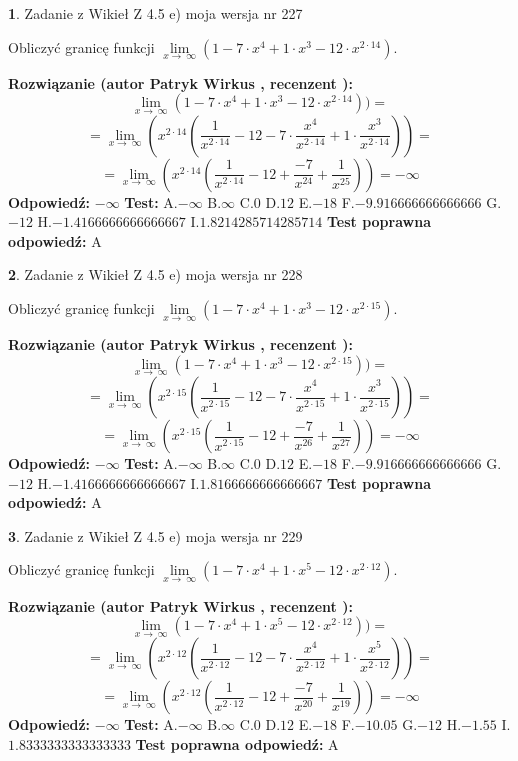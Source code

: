 \documentclass[12pt, a4paper]{article}
\theoremstyle{definition} %
\newtheorem{zad}{}
\newcommand{\zadStart}[1]{\begin{zad}#1\newline}
\newcommand{\zadStop}{\end{zad}}
\newcommand{\rozwStart}[2]{\noindent \textbf{Rozwiązanie (autor #1 , recenzent #2): }\newline}
\newcommand{\rozwStop}{\newline}
\newcommand{\odpStart}{\noindent \textbf{Odpowiedź:}\newline}
\newcommand{\odpStop}{\newline}
\newcommand{\testStart}{\noindent \textbf{Test:}\newline}
\newcommand{\testStop}{\newline}
\newcommand{\kluczStart}{\noindent \textbf{Test poprawna odpowiedź:}\newline}
\newcommand{\kluczStop}{\newline}
\begin{document}
\zadStart{Zadanie z Wikieł Z 4.5 e) moja wersja nr 227}


Obliczyć granicę funkcji  $\lim\limits_{x\to\ \infty}(1 - 7 \cdot x^{4}+1 \cdot x^{3}- 12 \cdot x^{2\cdot14})$.
\zadStop
\rozwStart{Patryk Wirkus}{}
$$\lim\limits_{x\to\ \infty}(1 - 7 \cdot x^{4}+1 \cdot x^{3}- 12 \cdot x^{2\cdot14}))=$$
$$=\lim\limits_{x\to\ \infty}(x^{2\cdot14}(\frac{1}{x^{2\cdot14}}-12 -7 \cdot \frac{x^{4}}{x^{2\cdot14}}+1 \cdot \frac{x^{3}}{x^{2\cdot14}}))=$$
$$=\lim\limits_{x\to\ \infty}(x^{2\cdot14}(\frac{1}{x^{2\cdot14}}-12 + \frac{-7}{x^{24}}+ \frac{1}{x^{25}}))=-\infty$$
\rozwStop
\odpStart
$-\infty$
\odpStop
\testStart
A.$-\infty$ B.$\infty$ C.$0$ D.$12$ E.$-18$
F.$-9.916666666666666$ G.$-12$
H.$-1.4166666666666667$
I.$1.8214285714285714$
\testStop
\kluczStart
A
\kluczStop



\zadStart{Zadanie z Wikieł Z 4.5 e) moja wersja nr 228}


Obliczyć granicę funkcji  $\lim\limits_{x\to\ \infty}(1 - 7 \cdot x^{4}+1 \cdot x^{3}- 12 \cdot x^{2\cdot15})$.
\zadStop
\rozwStart{Patryk Wirkus}{}
$$\lim\limits_{x\to\ \infty}(1 - 7 \cdot x^{4}+1 \cdot x^{3}- 12 \cdot x^{2\cdot15}))=$$
$$=\lim\limits_{x\to\ \infty}(x^{2\cdot15}(\frac{1}{x^{2\cdot15}}-12 -7 \cdot \frac{x^{4}}{x^{2\cdot15}}+1 \cdot \frac{x^{3}}{x^{2\cdot15}}))=$$
$$=\lim\limits_{x\to\ \infty}(x^{2\cdot15}(\frac{1}{x^{2\cdot15}}-12 + \frac{-7}{x^{26}}+ \frac{1}{x^{27}}))=-\infty$$
\rozwStop
\odpStart
$-\infty$
\odpStop
\testStart
A.$-\infty$ B.$\infty$ C.$0$ D.$12$ E.$-18$
F.$-9.916666666666666$ G.$-12$
H.$-1.4166666666666667$
I.$1.8166666666666667$
\testStop
\kluczStart
A
\kluczStop



\zadStart{Zadanie z Wikieł Z 4.5 e) moja wersja nr 229}


Obliczyć granicę funkcji  $\lim\limits_{x\to\ \infty}(1 - 7 \cdot x^{4}+1 \cdot x^{5}- 12 \cdot x^{2\cdot12})$.
\zadStop
\rozwStart{Patryk Wirkus}{}
$$\lim\limits_{x\to\ \infty}(1 - 7 \cdot x^{4}+1 \cdot x^{5}- 12 \cdot x^{2\cdot12}))=$$
$$=\lim\limits_{x\to\ \infty}(x^{2\cdot12}(\frac{1}{x^{2\cdot12}}-12 -7 \cdot \frac{x^{4}}{x^{2\cdot12}}+1 \cdot \frac{x^{5}}{x^{2\cdot12}}))=$$
$$=\lim\limits_{x\to\ \infty}(x^{2\cdot12}(\frac{1}{x^{2\cdot12}}-12 + \frac{-7}{x^{20}}+ \frac{1}{x^{19}}))=-\infty$$
\rozwStop
\odpStart
$-\infty$
\odpStop
\testStart
A.$-\infty$ B.$\infty$ C.$0$ D.$12$ E.$-18$
F.$-10.05$ G.$-12$
H.$-1.55$
I.$1.8333333333333333$
\testStop
\kluczStart
A
\kluczStop
\end{document}
